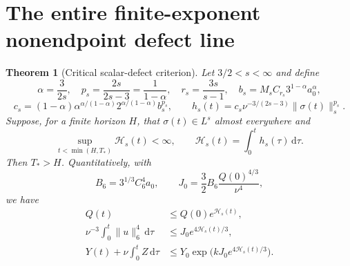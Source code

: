 \documentclass[11pt,a4paper]{article}
\newtheorem{theorem}{Theorem}[section]
\theoremstyle{definition}\newtheorem{hypothesis}[theorem]{Hypothesis}
\theoremstyle{remark}\newtheorem{remark}[theorem]{Remark}
\newcommand{\dd}{\,\mathrm d}
\newcommand{\norm}[1]{\lVert #1\rVert}
\numberwithin{equation}{section}
\begin{document}
\section{The entire finite-exponent nonendpoint defect line}
\begin{theorem}[Critical scalar-defect criterion]\label{db:family}
Let $3/2<s<\infty$ and define
\begin{equation}\label{db:exponents}
 \alpha=\frac{3}{2s},\quad p_s=\frac{2s}{2s-3}=\frac1{1-\alpha},
 \quad r_s=\frac{3s}{s-1},\quad
 b_s=M_s C_{r_s}3^{1-\alpha}a_0^\alpha,
\end{equation}
\begin{equation}\label{db:cs}
 c_s=(1-\alpha)\alpha^{\alpha/(1-\alpha)}
           2^{\alpha/(1-\alpha)}b_s^{p_s},\qquad
 h_s(t)=c_s\nu^{-3/(2s-3)}\norm{\sigma(t)}_s^{p_s}.
\end{equation}
Suppose, for a finite horizon $H$, that $\sigma(t)\in L^s$ almost everywhere
and
\begin{equation}\label{db:Hfinite}
 \sup_{t<\min(H,T_*)}\mathcal H_s(t)<\infty,\qquad
 \mathcal H_s(t)=\int_0^t h_s(\tau)\dd\tau.
\end{equation}
Then $T_*>H$. Quantitatively, with
\begin{equation}\label{db:J0}
 B_6=3^{1/3}C_6^4a_0,\qquad
 J_0=\frac32 B_6\frac{Q(0)^{4/3}}{\nu^4},
\end{equation}
we have
\begin{align}
 Q(t)&\le Q(0)e^{\mathcal H_s(t)},\label{db:Qbound}\\
 \nu^{-3}\int_0^t\norm u_6^4\dd\tau
 &\le J_0e^{4\mathcal H_s(t)/3},\label{db:familyl6}\\
 Y(t)+\nu\int_0^t Z\dd\tau
 &\le Y_0\exp\bigl(kJ_0e^{4\mathcal H_s(t)/3}\bigr).
 \label{db:familyY}
\end{align}
\end{theorem}
\end{document}
